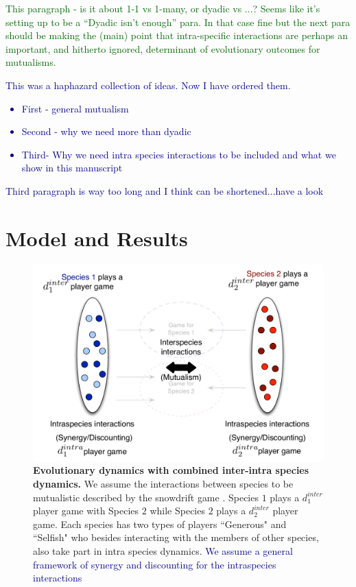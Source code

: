 \documentclass{pnastwo}
\newcommand{\cha}[1]{\textcolor{darkblue}{#1}}
\newcommand{\marcus}[1]{\textcolor{darkgreen}{#1}}
\begin{document}
\begin{article}
\marcus{This paragraph - is it about 1-1 vs 1-many, or dyadic vs ...?  Seems like it's setting up to be a ``Dyadic isn't enough'' para. In that case fine but the next para should be making the (main) point that intra-specific interactions are perhaps an important, and hitherto ignored, determinant of evolutionary outcomes for mutualisms.  }
\cha{This was a haphazard collection of ideas. Now I have ordered them.
\begin{itemize}
	\item First - general mutualism
\item Second - why we need more than dyadic
\item Third- Why we need intra species interactions to be included and what we show in this manuscript
\end{itemize}
Third paragraph is way too long and I think can be shortened...have a look
}


\section{Model and Results}


\begin{figure}
\begin{center}
\includegraphics[width=\columnwidth]{../Figures/interintra.pdf}
\caption{
\textbf{Evolutionary dynamics with combined inter-intra species dynamics.}
We assume the interactions between species to be mutualistic described by the snowdrift game \cite{bergstrom:PNAS:2003,souza:JTB:2009,gokhale:PRSB:2012}.
Species $1$ plays a $d_1^{inter}$ player game with Species $2$ while Species $2$ plays a $d_2^{inter}$ player game.
Each species has two types of players ``Generous" and ``Selfish" who besides interacting with the members of other species, also take part in intra species dynamics.
\cha{We assume a general framework of synergy and discounting for the intraspecies interactions \cite{eshel:AmNat:1988,hauert:JTB:2006a}
}
\label{fig:conceptart}
}
\end{center}
\end{figure}




\end{article}
\end{document}
